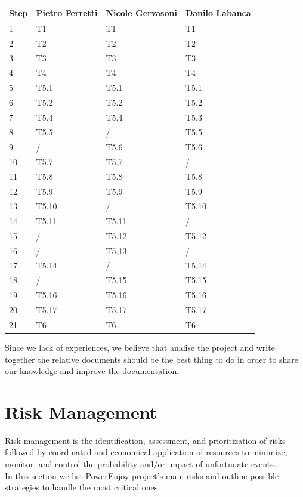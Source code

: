\documentclass[english]{article}
\begin{document}
\paragraph{}
\begin{center}
	\begin{tabular}{|p{1cm}|p{3cm}|p{3cm}|p{3cm}|}
		\hline
		\multicolumn{1}{|c|}{\textbf{Step}} & \multicolumn{1}{c|}{\textbf{Pietro Ferretti}} & \multicolumn{1}{c|}{\textbf{Nicole Gervasoni}} & \multicolumn{1}{c|}{\textbf{Danilo Labanca}} \\
		\hline
		1 & T1 & T1 & T1\\
		\hline
		2 & T2 & T2 & T2\\
		\hline
		3 & T3 & T3 & T3\\
		\hline
		4 & T4 & T4 & T4\\
		\hline
		5 & T5.1 & T5.1 & T5.1\\
		\hline
		6 & T5.2  & T5.2 & T5.2\\
		\hline
		7 & T5.4 & T5.4 & T5.3\\
		\hline
		8 & T5.5 & / & T5.5\\
		\hline
		9 & / & T5.6 & T5.6\\
		\hline
		10 & T5.7 & T5.7 & /\\
		\hline
		11 & T5.8 & T5.8 & T5.8\\
		\hline
		12 & T5.9 & T5.9 & T5.9\\
		\hline
		13 & T5.10 & / & T5.10\\
		\hline
		14 & T5.11 & T5.11 & /\\
		\hline
		15 & / & T5.12 & T5.12\\
		\hline
		16 & / & T5.13 & /\\
		\hline
		17 & T5.14 & / & T5.14\\
		\hline
		18 & / & T5.15 & T5.15\\
		\hline
		19 & T5.16 & T5.16 & T5.16\\
		\hline
		20 & T5.17 & T5.17 & T5.17\\
		\hline
		21 & T6 & T6 & T6\\
		\hline
	\end{tabular}
\end{center}

Since we lack of experiences, we believe that analise the project and write together the relative documents should be the best thing to do in order to share our knowledge and improve the documentation.

\newpage
\section{Risk Management}
Risk management is the identification, assessment, and prioritization of risks followed by coordinated and economical application of resources to minimize, monitor, and control the probability and/or impact of unfortunate events.\\
In this section we list PowerEnjoy project's main risks and outline possible strategies to handle the most critical ones.
\end{document}
